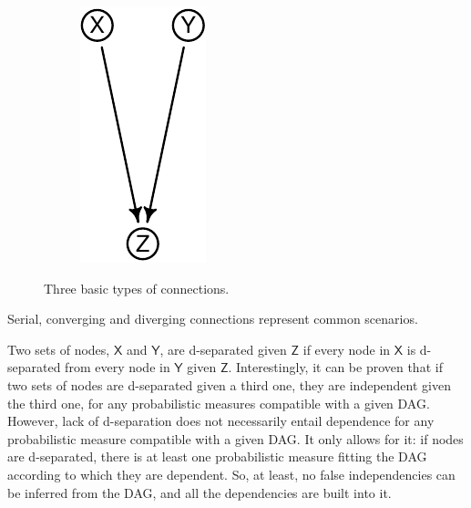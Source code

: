 \documentclass[
  10pt,
  dvipsnames,enabledeprecatedfontcommands]{scrartcl}
\begin{document}
\begin{figure}[H]
{\begin{subfigure}[!ht]{0.32\textwidth}
\begin{center}\includegraphics[width=0.75\linewidth]{conjunction-appendix14_files/figure-latex/unnamed-chunk-4-1} \end{center}
\end{subfigure}}
\normalsize
\caption{Three basic types of connections.}
\label{fig:connectionsBN}
\end{figure}

\noindent Serial, converging and diverging connections represent common
scenarios.

Two sets of nodes, \(\mathsf{X}\) and \(\mathsf{Y}\), are d-separated
given \(\mathsf{Z}\) if every node in \(\mathsf{X}\) is d-separated from
every node in \(\mathsf{Y}\) given \(\mathsf{Z}\). Interestingly, it can
be proven that if two sets of nodes are d-separated given a third one,
they are independent given the third one, for any probabilistic measures
compatible with a given DAG. However, lack of d-separation does not
necessarily entail dependence for any probabilistic measure compatible
with a given DAG. It only allows for it: if nodes are d-separated, there
is at least one probabilistic measure fitting the DAG according to which
they are dependent. So, at least, no false independencies can be
inferred from the DAG, and all the dependencies are built into it.
\end{document}
